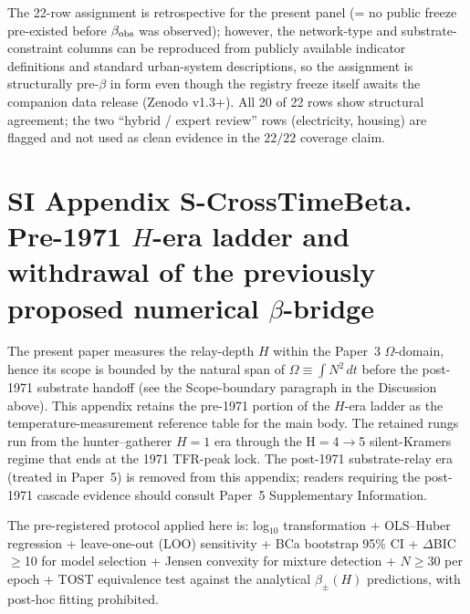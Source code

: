\begin{table}[h]
\smallskip
{}
\renewcommand{\arraystretch}{1.0}
\end{table}

The 22-row assignment is retrospective for the present panel (= no public freeze pre-existed before \(\beta_{\rm obs}\) was observed); however, the network-type and substrate-constraint columns can be reproduced from publicly available indicator definitions and standard urban-system descriptions, so the assignment is structurally pre-\(\beta\) in form even though the registry freeze itself awaits the companion data release (Zenodo v1.3+). All 20 of 22 rows show structural agreement; the two ``hybrid / expert review'' rows (electricity, housing) are flagged and not used as clean evidence in the \(22/22\) coverage claim.

\clearpage
\section*{SI Appendix S-CrossTimeBeta. Pre-1971 \(H\)-era ladder and withdrawal of the previously proposed numerical \(\beta\)-bridge}\label{sec:S-CrossTimeBeta}

The present paper measures the relay-depth \(H\) within the Paper~3 \(\Omega\)-domain, hence its scope is bounded by the natural span of \(\Omega\equiv\int N^{2}\,dt\) before the post-1971 substrate handoff (see the Scope-boundary paragraph in the Discussion above). This appendix retains the pre-1971 portion of the \(H\)-era ladder as the temperature-measurement reference table for the main body. The retained rungs run from the hunter--gatherer \(H{=}1\) era through the H${=}$4$\to$5 silent-Kramers regime that ends at the 1971 TFR-peak lock. The post-1971 substrate-relay era (treated in Paper~5) is removed from this appendix; readers requiring the post-1971 cascade evidence should consult Paper~5 Supplementary Information.

The pre-registered protocol applied here is: log\(_{10}\) transformation + OLS--Huber regression + leave-one-out (LOO) sensitivity + BCa bootstrap 95\% CI + \(\Delta\)BIC\(\geq\)10 for model selection + Jensen convexity for mixture detection + \(N\geq30\) per epoch + TOST equivalence test against the analytical \(\beta_{\pm}(H)\) predictions, with post-hoc fitting prohibited.

